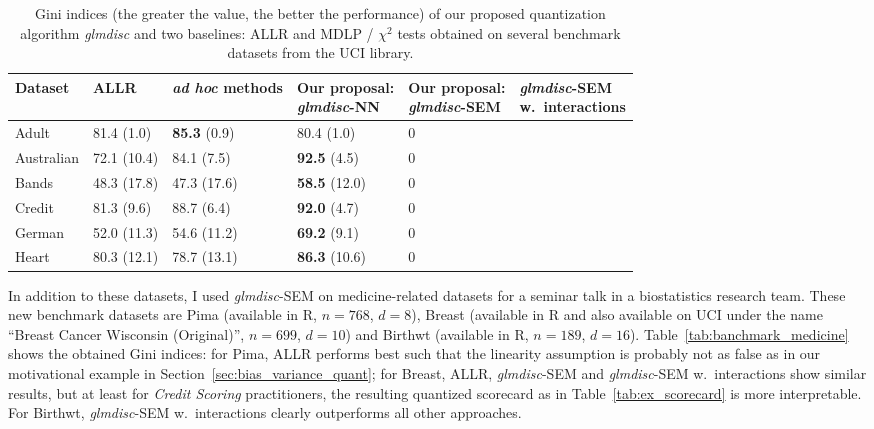 \begin{table}
    \centering
        \caption{Gini indices (the greater the value, the better the performance) of our proposed quantization algorithm \textit{glmdisc} and two baselines: ALLR and MDLP / $\chi^2$ tests obtained on several benchmark datasets from the UCI library.}
    \label{tab:banchmark_inter}
\begin{small}
\begin{tabular}{llllll}
Dataset & ALLR & \textit{ad hoc} methods & \makecell{Our proposal:\\ \textit{glmdisc}-NN} & \makecell{Our proposal:\\ \textit{glmdisc}-SEM} & \makecell{\textit{glmdisc}-SEM\\ w.\ interactions} \\
\hline
Adult & 81.4 (1.0) & \textbf{85.3} (0.9) & 80.4 (1.0) & 0 & \\
Australian & 72.1 (10.4) & 84.1 (7.5) & \textbf{92.5} (4.5) & 0 & \\
Bands & 48.3 (17.8) & 47.3 (17.6) & \textbf{58.5} (12.0) & 0 & \\
Credit & 81.3 (9.6) & 88.7 (6.4) & \textbf{92.0} (4.7) & 0 & \\
German & 52.0 (11.3) & 54.6 (11.2) & \textbf{69.2} (9.1) & 0 & \\
Heart & 80.3 (12.1) & 78.7 (13.1) & \textbf{86.3} (10.6) & 0 & 
\end{tabular}
\end{small}
\end{table}


In addition to these datasets, I used \textit{glmdisc}-SEM on medicine-related datasets for a seminar talk in a biostatistics research team. These new benchmark datasets are Pima (available in \textsf{R}, $n=768$, $d=8$), Breast (available in \textsf{R} and also available on UCI under the name ``Breast Cancer Wisconsin (Original)'', $n=699$, $d=10$) and Birthwt (available in \textsf{R}, $n=189$, $d=16$). Table~\ref{tab:banchmark_medicine} shows the obtained Gini indices: for Pima, ALLR performs best such that the linearity assumption is probably not as false as in our motivational example in Section~\ref{sec:bias_variance_quant}; for Breast, ALLR, \textit{glmdisc}-SEM and \textit{glmdisc}-SEM w.\ interactions show similar results, but at least for \textit{Credit Scoring} practitioners, the resulting quantized scorecard as in Table~\ref{tab:ex_scorecard} is more interpretable. For Birthwt, \textit{glmdisc}-SEM w.\ interactions clearly outperforms all other approaches.

